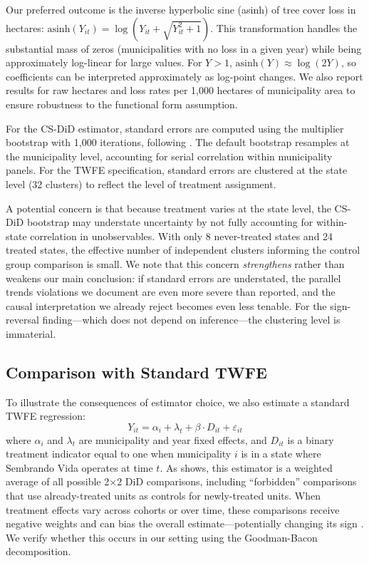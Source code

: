 \documentclass[12pt]{article}
\begin{document}
Our preferred outcome is the inverse hyperbolic sine (asinh) of tree cover loss in hectares: $\text{asinh}(Y_{it}) = \log(Y_{it} + \sqrt{Y_{it}^2 + 1})$. This transformation handles the substantial mass of zeros (municipalities with no loss in a given year) while being approximately log-linear for large values. For $Y > 1$, $\text{asinh}(Y) \approx \log(2Y)$, so coefficients can be interpreted approximately as log-point changes. We also report results for raw hectares and loss rates per 1,000 hectares of municipality area to ensure robustness to the functional form assumption.

For the CS-DiD estimator, standard errors are computed using the multiplier bootstrap with 1,000 iterations, following \citet{callaway2021difference}. The default bootstrap resamples at the municipality level, accounting for serial correlation within municipality panels. For the TWFE specification, standard errors are clustered at the state level (32 clusters) to reflect the level of treatment assignment.

A potential concern is that because treatment varies at the state level, the CS-DiD bootstrap may understate uncertainty by not fully accounting for within-state correlation in unobservables. With only 8 never-treated states and 24 treated states, the effective number of independent clusters informing the control group comparison is small. We note that this concern \textit{strengthens} rather than weakens our main conclusion: if standard errors are understated, the parallel trends violations we document are even more severe than reported, and the causal interpretation we already reject becomes even less tenable. For the sign-reversal finding---which does not depend on inference---the clustering level is immaterial.

\subsection{Comparison with Standard TWFE}

To illustrate the consequences of estimator choice, we also estimate a standard TWFE regression:
\begin{equation}
Y_{it} = \alpha_i + \lambda_t + \beta \cdot D_{it} + \varepsilon_{it}
\end{equation}
where $\alpha_i$ and $\lambda_t$ are municipality and year fixed effects, and $D_{it}$ is a binary treatment indicator equal to one when municipality $i$ is in a state where Sembrando Vida operates at time $t$. As \citet{goodmanbacon2021difference} shows, this estimator is a weighted average of all possible 2$\times$2 DiD comparisons, including ``forbidden'' comparisons that use already-treated units as controls for newly-treated units. When treatment effects vary across cohorts or over time, these comparisons receive negative weights and can bias the overall estimate---potentially changing its sign \citep[see also][]{sun2021estimating, borusyak2024revisiting, dechaisemartin2020two}. We verify whether this occurs in our setting using the Goodman-Bacon decomposition.
\end{document}
